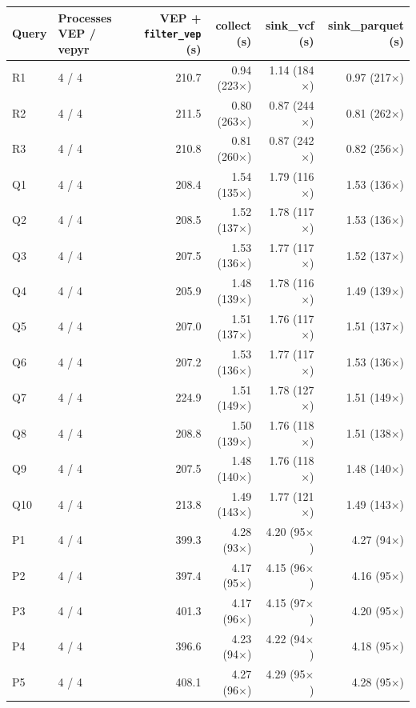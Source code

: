 \begin{tabular}{llrrrr}
\toprule
Query & Processes VEP / vepyr & VEP + \texttt{filter\_vep} (s) & collect (s) & sink\_vcf (s) & sink\_parquet (s) \\
\midrule
R1 & 4 / 4 & 210.7 & 0.94 (223$\times$) & 1.14 (184$\times$) & 0.97 (217$\times$) \\
R2 & 4 / 4 & 211.5 & 0.80 (263$\times$) & 0.87 (244$\times$) & 0.81 (262$\times$) \\
R3 & 4 / 4 & 210.8 & 0.81 (260$\times$) & 0.87 (242$\times$) & 0.82 (256$\times$) \\
Q1 & 4 / 4 & 208.4 & 1.54 (135$\times$) & 1.79 (116$\times$) & 1.53 (136$\times$) \\
Q2 & 4 / 4 & 208.5 & 1.52 (137$\times$) & 1.78 (117$\times$) & 1.53 (136$\times$) \\
Q3 & 4 / 4 & 207.5 & 1.53 (136$\times$) & 1.77 (117$\times$) & 1.52 (137$\times$) \\
Q4 & 4 / 4 & 205.9 & 1.48 (139$\times$) & 1.78 (116$\times$) & 1.49 (139$\times$) \\
Q5 & 4 / 4 & 207.0 & 1.51 (137$\times$) & 1.76 (117$\times$) & 1.51 (137$\times$) \\
Q6 & 4 / 4 & 207.2 & 1.53 (136$\times$) & 1.77 (117$\times$) & 1.53 (136$\times$) \\
Q7 & 4 / 4 & 224.9 & 1.51 (149$\times$) & 1.78 (127$\times$) & 1.51 (149$\times$) \\
Q8 & 4 / 4 & 208.8 & 1.50 (139$\times$) & 1.76 (118$\times$) & 1.51 (138$\times$) \\
Q9 & 4 / 4 & 207.5 & 1.48 (140$\times$) & 1.76 (118$\times$) & 1.48 (140$\times$) \\
Q10 & 4 / 4 & 213.8 & 1.49 (143$\times$) & 1.77 (121$\times$) & 1.49 (143$\times$) \\
P1 & 4 / 4 & 399.3 & 4.28 (93$\times$) & 4.20 (95$\times$) & 4.27 (94$\times$) \\
P2 & 4 / 4 & 397.4 & 4.17 (95$\times$) & 4.15 (96$\times$) & 4.16 (95$\times$) \\
P3 & 4 / 4 & 401.3 & 4.17 (96$\times$) & 4.15 (97$\times$) & 4.20 (95$\times$) \\
P4 & 4 / 4 & 396.6 & 4.23 (94$\times$) & 4.22 (94$\times$) & 4.18 (95$\times$) \\
P5 & 4 / 4 & 408.1 & 4.27 (96$\times$) & 4.29 (95$\times$) & 4.28 (95$\times$) \\
\bottomrule
\end{tabular}
